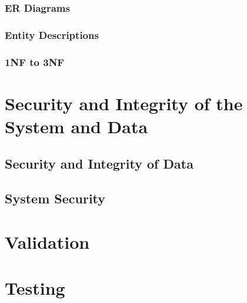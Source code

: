 \subsubsection{ER Diagrams}

\subsubsection{Entity Descriptions}

\subsubsection{1NF to 3NF}

\section{Security and Integrity of the System and Data}

\subsection{Security and Integrity of Data}

\subsection{System Security}

\section{Validation}

\section{Testing}

